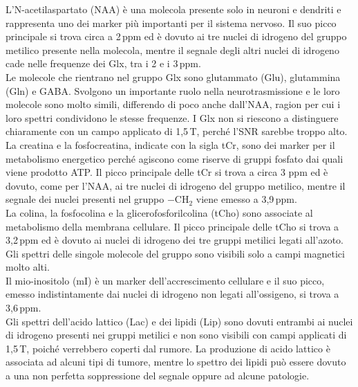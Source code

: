 \documentclass{report}
\numberwithin{equation}{section}
\numberwithin{figure}{section}
\begin{document}
L'N-acetilaspartato (NAA) è una molecola presente solo in neuroni e dendriti e rappresenta uno dei marker più importanti per il sistema nervoso. Il suo picco principale si trova circa a 2\,ppm ed è dovuto ai tre nuclei di idrogeno del gruppo metilico presente nella molecola, mentre il segnale degli altri nuclei di idrogeno cade nelle frequenze dei Glx, tra i 2 e i 3\,ppm.\\
Le molecole che rientrano nel gruppo Glx sono glutammato (Glu), glutammina (Gln) e GABA. Svolgono un importante ruolo nella neurotrasmissione e le loro molecole sono molto simili, differendo di poco anche dall'NAA, ragion per cui i loro spettri condividono le stesse frequenze. I Glx non si riescono a distinguere chiaramente con un campo applicato di 1,5\,T, perché l'SNR sarebbe troppo alto.\\
La creatina e la fosfocreatina, indicate con la sigla tCr, sono dei marker per il metabolismo energetico perché agiscono come riserve di gruppi fosfato dai quali viene prodotto ATP. Il picco principale delle tCr si trova a circa 3 ppm ed è dovuto, come per l'NAA, ai tre nuclei di idrogeno del gruppo metilico, mentre il segnale dei nuclei presenti nel gruppo $\mathrm{-CH_2}$ viene emesso a 3,9\,ppm.\\
La colina, la fosfocolina e la glicerofosforilcolina (tCho) sono associate al metabolismo della membrana cellulare. Il picco principale delle tCho si trova a 3,2\,ppm ed è dovuto ai nuclei di idrogeno dei tre gruppi metilici legati all'azoto. Gli spettri delle singole molecole del gruppo sono visibili solo a campi magnetici molto alti.\\
Il mio-inositolo (mI) è un marker dell'accrescimento cellulare e il suo picco, emesso indistintamente dai nuclei di idrogeno non legati all'ossigeno, si trova a 3,6\,ppm.\\
Gli spettri dell'acido lattico (Lac) e dei lipidi (Lip) sono dovuti entrambi ai nuclei di idrogeno presenti nei gruppi metilici e non sono visibili con campi applicati di 1,5\,T, poiché verrebbero coperti dal rumore. La produzione di acido lattico è associata ad alcuni tipi di tumore, mentre lo spettro dei lipidi può essere dovuto a una non perfetta soppressione del segnale oppure ad alcune patologie.
\end{document}
